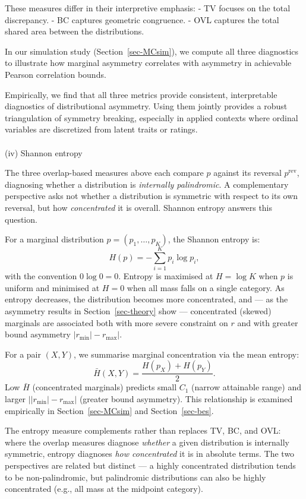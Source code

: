 \documentclass[
  12pt,
]{article}
\makeatletter
\let\oldparagraph\paragraph
\renewcommand{\paragraph}{
    \@ifstar
      \xxxParagraphStar
      \xxxParagraphNoStar
  }
\newcommand{\xxxParagraphStar}[1]{\oldparagraph*{#1}\mbox{}}
\newcommand{\xxxParagraphNoStar}[1]{\oldparagraph{#1}\mbox{}}
\theoremstyle{plain}
\theoremstyle{definition}
\theoremstyle{remark}
\makeatother
\begin{document}
These measures differ in their interpretive emphasis: - TV focuses on
the total discrepancy. - BC captures geometric congruence. - OVL
captures the total shared area between the distributions.

In our simulation study (Section~\ref{sec-MCsim}), we compute all three
diagnostics to illustrate how marginal asymmetry correlates with
asymmetry in achievable Pearson correlation bounds.

Empirically, we find that all three metrics provide consistent,
interpretable diagnostics of distributional asymmetry. Using them
jointly provides a robust triangulation of symmetry breaking, especially
in applied contexts where ordinal variables are discretized from latent
traits or ratings.

\paragraph{(iv) Shannon entropy}\label{iv-shannon-entropy}

The three overlap-based measures above each compare \(p\) against its
reversal \(p^{\mathrm{rev}}\), diagnosing whether a distribution is
\emph{internally palindromic}. A complementary perspective asks not
whether a distribution is symmetric with respect to its own reversal,
but how \emph{concentrated} it is overall. Shannon entropy answers this
question.

For a marginal distribution \(p = (p_1, \ldots, p_K)\), the Shannon
entropy is: \[
H(p) = -\sum_{i=1}^{K} p_i \log p_i,
\] with the convention \(0 \log 0 = 0\). Entropy is maximised at
\(H = \log K\) when \(p\) is uniform and minimised at \(H = 0\) when all
mass falls on a single category. As entropy decreases, the distribution
becomes more concentrated, and --- as the asymmetry results in
Section~\ref{sec-theory} show --- concentrated (skewed) marginals are
associated both with more severe constraint on \(r\) and with greater
bound asymmetry \(|r_{\min}| - r_{\max}|\).

For a pair \((X, Y)\), we summarise marginal concentration via the mean
entropy: \[
\bar{H}(X,Y) = \frac{H(p_X) + H(p_Y)}{2}.
\] Low \(\bar{H}\) (concentrated marginals) predicts small \(C_1\)
(narrow attainable range) and larger
\(\bigl||r_{\min}| - r_{\max}\bigr|\) (greater bound asymmetry). This
relationship is examined empirically in Section~\ref{sec-MCsim} and
Section~\ref{sec-bes}.

The entropy measure complements rather than replaces TV, BC, and OVL:
where the overlap measures diagnose \emph{whether} a given distribution
is internally symmetric, entropy diagnoses \emph{how concentrated} it is
in absolute terms. The two perspectives are related but distinct --- a
highly concentrated distribution tends to be non-palindromic, but
palindromic distributions can also be highly concentrated (e.g., all
mass at the midpoint category).
\end{document}
